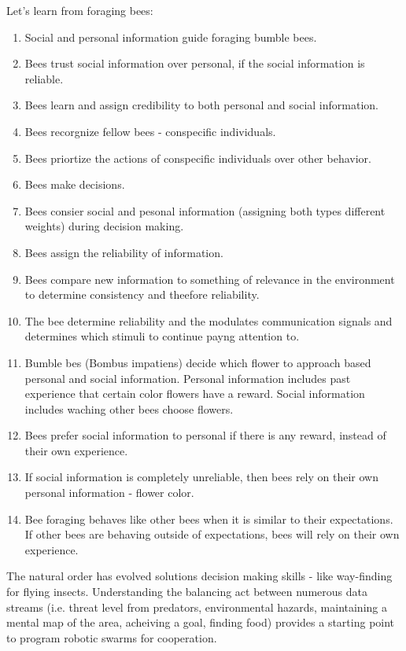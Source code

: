 \documentclass[a4paper,11pt]{article}
\begin{document}
Let's learn from foraging bees: \cite{dunlap2016foraging}
\begin{enumerate}
\item Social and personal information guide foraging bumble bees.
\item Bees trust social information over personal, if the social information is reliable.
\item Bees learn and assign credibility to both personal and social information.
\item Bees recorgnize fellow bees - conspecific individuals.
\item Bees priortize the actions of conspecific individuals over other behavior.
\item Bees make decisions.
\item Bees consier social and pesonal information (assigning both types different weights) during decision making.
\item Bees assign the reliability of information.
\item Bees compare new information to something of relevance in the environment to determine consistency and theefore reliability.
\item The bee determine reliability and the modulates communication signals and determines which stimuli to continue payng attention to.
\item Bumble bes (Bombus impatiens) decide which flower to approach based personal and social information. Personal information includes past experience that certain color flowers have a reward. Social information includes waching other bees choose flowers.
\item Bees prefer social information to personal if there is any reward, instead of their own experience.
\item If social information is completely unreliable, then bees rely on their own personal information - flower color.
\item Bee foraging behaves like other bees when it is similar to their expectations. If other bees are behaving outside of expectations, bees will rely on their own experience.
\end{enumerate}




The natural order has evolved solutions decision making skills - like way-finding for flying insects. Understanding the balancing act between numerous data streams (i.e. threat level from predators, environmental hazards, maintaining a mental map of the area, acheiving a goal, finding food) provides a starting point to program robotic swarms for cooperation.
\end{document}
